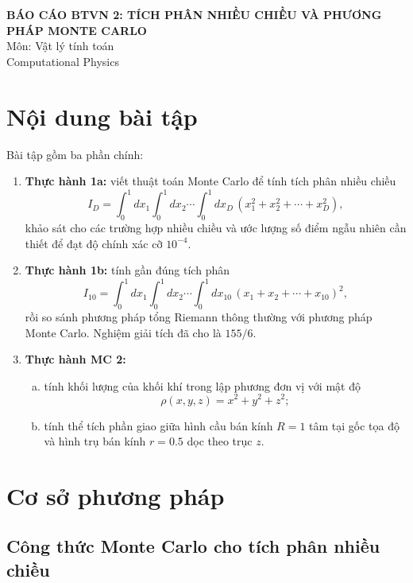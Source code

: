 \documentclass{article}
\begin{document}
\begin{center}
    {\LARGE \textbf{BÁO CÁO BTVN 2: TÍCH PHÂN NHIỀU CHIỀU VÀ PHƯƠNG PHÁP MONTE CARLO}}\\[0.5em]
    {\large Môn: Vật lý tính toán\\[0.5em]Computational Physics}
\end{center}

\vspace{1em}

\section{Nội dung bài tập}

Bài tập gồm ba phần chính:
\begin{enumerate}
    \item \textbf{Thực hành 1a:} viết thuật toán Monte Carlo để tính tích phân nhiều chiều
    \[
    I_D = \int_0^1 dx_1 \int_0^1 dx_2 \cdots \int_0^1 dx_D\,(x_1^2 + x_2^2 + \cdots + x_D^2),
    \]
    khảo sát cho các trường hợp nhiều chiều và ước lượng số điểm ngẫu nhiên cần thiết để đạt độ chính xác cỡ $10^{-4}$.

    \item \textbf{Thực hành 1b:} tính gần đúng tích phân
    \[
    I_{10} = \int_0^1 dx_1 \int_0^1 dx_2 \cdots \int_0^1 dx_{10}\,(x_1 + x_2 + \cdots + x_{10})^2,
    \]
    rồi so sánh phương pháp tổng Riemann thông thường với phương pháp Monte Carlo. Nghiệm giải tích đã cho là $155/6$.

    \item \textbf{Thực hành MC 2:}
    \begin{enumerate}[a)]
        \item tính khối lượng của khối khí trong lập phương đơn vị với mật độ
        \[
        \rho(x,y,z) = x^2 + y^2 + z^2;
        \]
        \item tính thể tích phần giao giữa hình cầu bán kính $R=1$ tâm tại gốc tọa độ và hình trụ bán kính $r=0.5$ dọc theo trục $z$.
    \end{enumerate}
\end{enumerate}

\section{Cơ sở phương pháp}

\subsection{Công thức Monte Carlo cho tích phân nhiều chiều}
\end{document}
